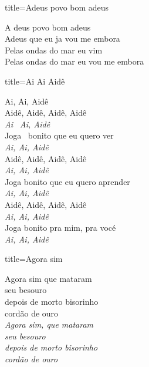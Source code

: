 \documentclass[fontsize=14pt, paper=a4, twoside, DIV=20]{scrreprt} %
\begin{document}
\begin{multicols*}{2}
\begin{song}{title={Adeus povo bom adeus}}
    \begin{verse*}
         A deus povo bom adeus\\
        Adeus que eu ja vou me embora\\
        Pelas ondas do mar eu vim\\
        Pelas ondas do mar eu vou me embora\\
    \end{verse*}
        \end{song}
\pagebreak
\begin{song}{title={Ai Ai Aidê}}
    \begin{verse*}
     Ai, Ai, Aidê\\
    Aidê, Aidê, Aidê, Aidê\\
    \textit{Ai}  \ \textit{Ai, Aidê}\\
    Joga \ bonito que eu quero ver\\
    \textit{Ai, Ai, Aidê}\\
    Aidê, Aidê, Aidê, Aidê\\
    \textit{Ai, Ai, Aidê}\\
    Joga bonito que eu quero aprender\\
    \textit{Ai, Ai, Aidê}\\
    Aidê, Aidê, Aidê, Aidê\\
    \textit{Ai, Ai, Aidê}\\
    Joga bonito pra mim, pra vocé\\
    \textit{Ai, Ai, Aidê}\\
    \end{verse*}
    \end{song}

\begin{song}{title={Agora sim}}

\begin{verse*}
Agora sim que mataram\\
seu besouro\\
depois de morto bisorinho\\
cordão de ouro\\
\textit{Agora sim, que mataram}\\
\textit{seu besouro}\\
\textit{depois de morto bisorinho}\\
\textit{cordão de ouro}\\
\end{verse*}


\end{song}
\end{multicols*}
\end{document}
